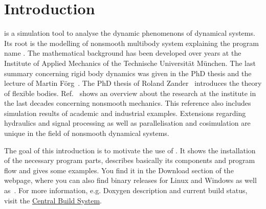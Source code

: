 \section{Introduction}
\MBSim{} is a simulation tool to analyse the dynamic phenomenons of dynamical systems. Its root is the modelling of nonsmooth multibody system explaining the program name \MBSim{}. The mathematical background has been developed over years at the Institute of Applied Mechanics of the Technische Universit\"at M\"unchen. The last summary concerning rigid body dynamics was given in the PhD thesis and the lecture of Martin F\"org~\cite{Foer09,Foer07}. The PhD thesis of Roland Zander~\cite{Zan09} introduces the theory of flexible bodies. Ref.~\cite{Zan08} shows an overview about the research at the institute in the last decades concerning nonsmooth mechanics. This reference also includes simulation results of academic and industrial examples. Extensions regarding hydraulics and signal processing as well as parallelisation and cosimulation are unique in the field of nonsmooth dynamical systems.\par
The goal of this introduction is to motivate the use of \MBSim{}. It shows the installation of the necessary program parts, describes basically its components and program flow and gives some examples. You find it in the Download section of the \MBSim{} webpage, where you can also find binary releases for Linux and Windows as well as~\cite{Zan08}. For more information, e.g. Doxygen description and current build status, visit the {\href{http://www4.amm.mw.tu-muenchen.de:8080/mbsim-env/}{\textsf{Central Build System}}}.

